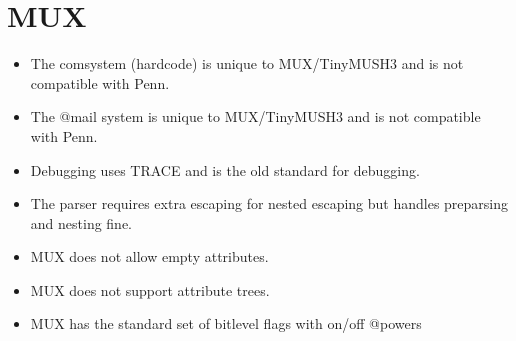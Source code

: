 \documentclass[letterpaper,10pt,english]{sphinxmanual}
\begin{document}
\section{MUX}
\label{\detokenize{11-differences:mux}}\begin{itemize}
\item {} 
\sphinxAtStartPar
The comsystem (hardcode) is unique to MUX/TinyMUSH3 and is not compatible
with Penn.

\item {} 
\sphinxAtStartPar
The @mail system is unique to MUX/TinyMUSH3 and is not compatible with Penn.

\item {} 
\sphinxAtStartPar
Debugging uses TRACE and is the old standard for debugging.

\item {} 
\sphinxAtStartPar
The parser requires extra escaping for nested escaping but handles pre\sphinxhyphen{}parsing
and nesting fine.

\item {} 
\sphinxAtStartPar
MUX does not allow empty attributes.

\item {} 
\sphinxAtStartPar
MUX does not support attribute trees.

\item {} 
\sphinxAtStartPar
MUX has the standard set of bitlevel flags with on/off @powers

\end{itemize}
\end{document}
